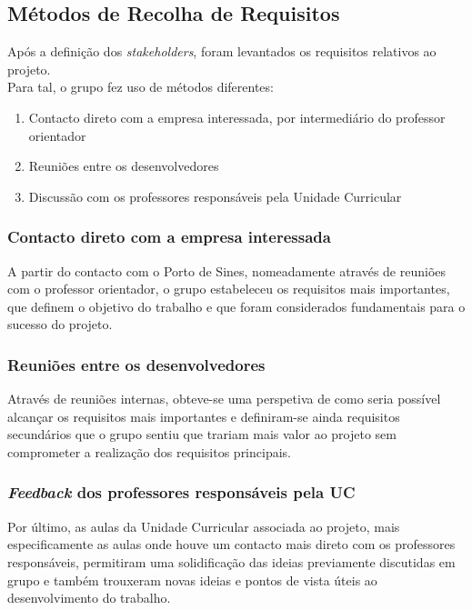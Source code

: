 \documentclass[a4paper,12pt]{article}
\begin{document}
\subsection{Métodos de Recolha de Requisitos}
Após a definição dos \textit{stakeholders}, foram levantados os requisitos relativos ao projeto.
\\
Para tal, o grupo fez uso de métodos diferentes:
\begin{enumerate}
    \item Contacto direto com a empresa interessada, por intermediário do professor orientador
    \item Reuniões entre os desenvolvedores
    \item Discussão com os professores responsáveis pela Unidade Curricular
\end{enumerate}

\subsubsection{Contacto direto com a empresa interessada}
A partir do contacto com o Porto de Sines, nomeadamente através de reuniões com o professor orientador, o grupo estabeleceu os requisitos mais importantes, que definem o objetivo do trabalho e que foram considerados fundamentais para o sucesso do projeto.

\subsubsection{Reuniões entre os desenvolvedores}
Através de reuniões internas, obteve-se uma perspetiva de como seria possível alcançar os requisitos mais importantes e definiram-se ainda requisitos secundários que o grupo sentiu que trariam mais valor ao projeto sem comprometer a realização dos requisitos principais.

\subsubsection{\textit{Feedback} dos professores responsáveis pela UC}
Por último, as aulas da Unidade Curricular associada ao projeto, mais especificamente as aulas onde houve um contacto mais direto com os professores responsáveis, permitiram uma solidificação das ideias previamente discutidas em grupo e também trouxeram novas ideias e pontos de vista úteis ao desenvolvimento do trabalho.
\end{document}
